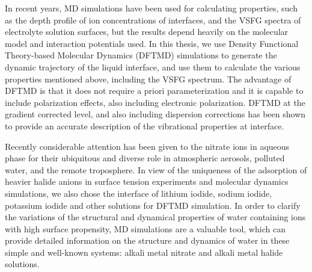 In recent years, MD simulations have been used for calculating properties, 
such as the depth profile of ion concentrations of interfaces\cite{Jungwirth2001,Jungwirth2002}, and the VSFG spectra 
of electrolyte solution surfaces\cite{Gopalakrishnan2006,Johnson2014,Ishiyama2014,Ishiyama2017},
but the results depend heavily on the molecular model and interaction potentials used\cite{LXD03,MKP04,TI07,MM05}.
In this thesis, we use Density Functional Theory-based Molecular Dynamics (DFTMD) simulations to generate the dynamic trajectory of 
the liquid interface, and use them to calculate the various properties mentioned above, including the VSFG spectrum.  
The advantage of DFTMD is that it does not require a priori parameterization and it is capable to include polarization effects\cite{Ufimtsev2011},
also including electronic polarization. DFTMD at the gradient corrected level, and also including dispersion corrections\cite{Grimme04,Grimme06,Grimme07,Grimme10,Baer2011}
has been shown to provide an accurate description of the vibrational properties at interface\cite{Fornaro2015}.

Recently considerable attention has been given to the nitrate ions in aqueous phase 
for their ubiquitous and diverse role in atmospheric aerosols, polluted water, 
and the remote troposphere\cite{XuM2009,Jubb2012}.
In view of the uniqueness of the adsorption of heavier halide anions in surface tension experiments and molecular dynamics simulations, 
we also chose the interface of lithium iodide, sodium iodide, potassium iodide and other solutions for DFTMD simulation.
In order to clarify the variations of the structural and dynamical properties 
of water containing ions with high surface propensity, MD simulations are a valuable tool, 
which can provide detailed information on the structure and dynamics  
of water in these simple and well-known systems: alkali metal nitrate and alkali metal halide solutions\cite{KM98}.

